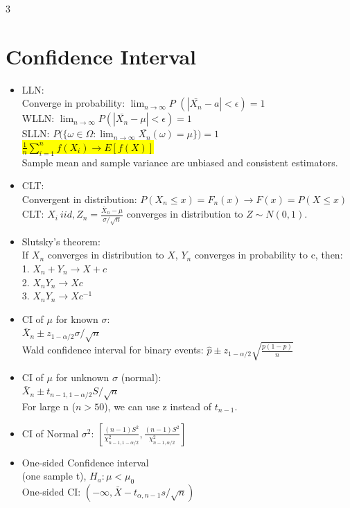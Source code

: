 \documentclass[a4paper,10pt]{article}
\begin{document}
\begin{multicols}{3}
\section*{Confidence Interval}
\begin{itemize}
    \item LLN:\\
    Converge in probability: $\lim_{n\to \infty} P$ $(|\bar{X_n}-a|<\epsilon)=1$\\
    WLLN: $\lim_{n\to \infty} P(|\bar{X_n}-\mu|<\epsilon)=1$\\
    SLLN: $P(\{\omega \in \Omega: \lim_{n\to \infty} $$\bar{X_n}(\omega)=\mu\})=1$\\
    \hl{$\frac{1}{n}\sum_{i=1}^nf(X_i)\to E[f(X)]$}\\
    Sample mean and sample variance are unbiased and consistent estimators. 
    \item CLT:\\
    Convergent in distribution: $P(X_n\le x)=F_n(x)\to F(x)=P(X\le x)$\\
    CLT: $X_i\ iid, Z_n=\frac{\bar{X}_n-\mu}{\sigma/\sqrt{n}}$ converges in distribution to $Z\sim N(0,1)$.
    \item Slutsky's theorem:\\
    If $X_n$ converges in distribution to $X$, $Y_n$ converges in probability to c, then:\\
    1. $X_n+Y_n\to X+c$\\
    2. $X_nY_n\to Xc$\\
    3. $X_nY_n\to Xc^{-1}$
    \item CI of $\mu$ for known $\sigma$:\\ $\bar{X}_n\pm z_{1-\alpha/2}\sigma /\sqrt{n}$\\
    Wald confidence interval for binary events: $\hat{p}\pm z_{1-\alpha/2}\sqrt{\frac{p(1-p)}{n}}$
    \item CI of $\mu$ for unknown $\sigma$ (normal):\\ $\bar{X}_n\pm t_{n-1,1-\alpha/2}S /\sqrt{n}$ \\
    For large n ($n>50$), we can use z instead of $t_{n-1}$.
    \item CI of Normal $\sigma^2$: $[\frac{(n-1)S^2}{\chi^2_{n-1,1-\alpha/2}},\frac{(n-1)S^2}{\chi^2_{n-1,\alpha/2}}]$
    \item One-sided Confidence interval\\
    (one sample t), $H_a:\mu<\mu_0$\\
    One-sided CI: $(-\infty,\bar{X}-t_{\alpha,n-1}s/\sqrt{n})$
\end{itemize}


\end{multicols}
\end{document}

